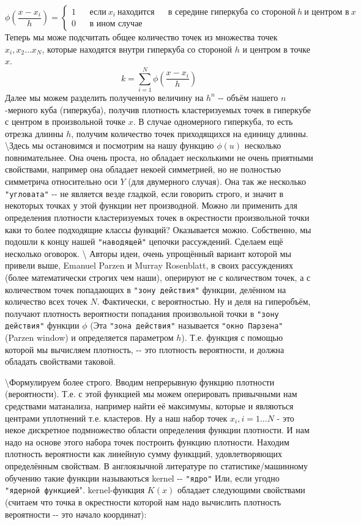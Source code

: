 \documentclass[11pt]{article}
\begin{document}
    \[
\phi\left(\frac{x - x_i}{h}\right) = \left\lbrace
            \begin{aligned}
            1 && \mbox{если} \: x_i \: \mbox{находится} && \mbox{в середине гиперкуба со стороной}\: h \: \mbox{и центром в} \: x \\
            0 && \mbox{в ином случае} &&
           \end{aligned}
          \right.
\] Теперь мы може подсчитать общее количество точек из множества точек
$x_i, x_2 \ldots x_N$, которые находятся внутри гиперкуба со стороной
$h$ и центром в точке $x$. \[
k = \sum\limits_{i = 1}^{N}\phi\left(\frac{x - x_i}{h}\right)
\] Далее мы можем разделить полученную величину на $h^n$ -\/- объём
нашего $n$-мерного куба (гиперкуба), получив плотность кластеризуемых
точек в гиперкубе с центром в произвольной точке $x$. В случае
одномерного гиперкуба, то есть отрезка длинны $h$, получим количество
точек приходящихся на единицу длинны. \textbackslash{}Здесь мы
остановимся и посмотрим на нашу функцию $\phi(u)$ несколько
повнимательнее. Она очень проста, но обладает несколькими не очень
приятными свойствами, например она обладает некоей симметрией, но не
полностью симметрича относительно оси $Y$ (для двумерного случая). Она
так же несколько \verb'"угловата"' -\/- не является везде гладкой, если
говорить строго, и значит в некоторых точках у этой функции нет
производной. Можно ли применить для определения плотности кластеризуемых
точек в окрестности произвольной точки каки то более подходящие классы
функций? Оказывается можно. Собственно, мы подошли к концу нашей
\verb'"наводящей"' цепочки рассуждений. Сделаем ещё несколько оговорок.
\textbackslash{} Авторы идеи, очень упрощённый вариант которой мы
привели выше, Emanuel Parzen и Murray Rosenblatt, в своих рассуждениях
(более математически строгих чем наши), оперируют не с количеством
точек, а с количеством точек попадающих в \verb'"зону действия"'
функции, делённом на количество всех точек $N$. Фактически, с
вероятностью. Ну и деля на гиперобъём, получают плотность вероятности
попадания произвольной точки в \verb'"зону действия"' функции $\phi$
(Эта \verb'"зона действия"' называется \verb'"окно Парзена"' (Parzen
window) \cite{litlink0} и определяется параметром $h$). Т.е. функция с
помощью которой мы вычисляем плотность, -\/- это плотность вероятности,
и должна обладать свойствами таковой.

    \textbackslash{}Формулируем более строго. Вводим непрерывную функцию
плотности (вероятности). Т.е. с этой функцией мы можем оперировать
привычными нам средствами матанализа, например найти её максимумы,
которые и являються центрами уплотнений т.е. кластеров. Ну а наш набор
точек $x_i, i = 1 \ldots N$ - это некое дискретное подмножество области
определения функции плотности. И нам надо на основе этого набора точек
построить функцию плотности. Находим плотность вероятности как линейную
сумму функцций, удовлетворяющих определённым свойствам. В англоязычной
литературе по статистике/машинному обучению такие функции называються
kernel -\/- \verb'"ядро"' Или, если угодно \verb'"ядерной функцией'".
kernel-функция $K(x)$ обладает следующими свойствами (считаем что точка
в окрестности которой нам надо вычислить плотность вероятности -\/- это
начало координат):
\end{document}
